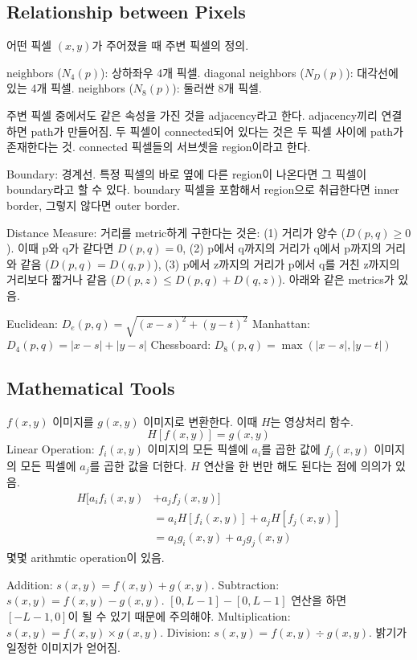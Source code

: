 \subsection{Relationship between Pixels}

어떤 픽셀 $(x, y)$가 주어졌을 때 주변 픽셀의 정의.

\bitmz
   neighbors ($N_4(p)$): 상하좌우 4개 픽셀.
   diagonal neighbors ($N_D(p)$): 대각선에 있는 4개 픽셀.
   neighbors ($N_8(p)$): 둘러싼 8개 픽셀.
\eitmz

주변 픽셀 중에서도 같은 속성을 가진 것을 adjacency라고 한다. adjacency끼리 연결하면 path가 만들어짐. 두 픽셀이 connected되어 있다는 것은 두 픽셀 사이에 path가 존재한다는 것. connected 픽셀들의 서브셋을 region이라고 한다.

Boundary: 경계선. 특정 픽셀의 바로 옆에 다른 region이 나온다면 그 픽셀이 boundary라고 할 수 있다. boundary 픽셀을 포함해서 region으로 취급한다면 inner border, 그렇지 않다면 outer border.

Distance Measure: 거리를 metric하게 구한다는 것은: (1) 거리가 양수 ($D(p, q) \geq 0$). 이때 p와 q가 같다면 $D(p, q) = 0$, (2) p에서 q까지의 거리가 q에서 p까지의 거리와 같음 ($D(p, q) = D(q, p)$), (3) p에서 z까지의 거리가 p에서 q를 거친 z까지의 거리보다 짧거나 같음 ($D(p, z) \leq D(p, q) + D(q, z)$). 아래와 같은 metrics가 있음.

\bitmz
  \itm Euclidean: $D_e(p, q) = \sqrt{(x - s)^2 + (y - t)^2}$
  \itm Manhattan: $D_4(p, q) = |x - s| + |y - s|$
  \itm Chessboard: $D_8(p, q) = \max(|x - s|, |y - t|)$
\eitmz

\subsection{Mathematical Tools}

$f(x, y)$ 이미지를 $g(x, y)$ 이미지로 변환한다. 이때 $H$는 영상처리 함수.
$$
H[f(x, y)] = g(x, y)
$$
Linear Operation: $f_i(x, y)$ 이미지의 모든 픽셀에 $a_i$를 곱한 값에 $f_j(x, y)$ 이미지의 모든 픽셀에 $a_j$를 곱한 값을 더한다. $H$ 연산을 한 번만 해도 된다는 점에 의의가 있음.
$$
\begin{aligned}
  H[a_i f_i(x, y) &+ a_j f_j(x, y)] \\
  &= a_i H[f_i(x, y)] + a_j H[f_j(x, y)] \\
  &= a_i g_i(x, y) + a_j g_j(x, y)
\end{aligned}
$$
몇몇 arithmtic operation이 있음.

\bitmz
  \itm Addition: $s(x, y) = f(x, y) + g(x, y)$.
  \itm Subtraction: $s(x, y) = f(x, y) - g(x, y)$. $[0, L - 1] - [0, L - 1]$ 연산을 하면 $[-L - 1, 0]$이 될 수 있기 때문에 주의해야.
  \itm Multiplication: $s(x, y) = f(x, y) \times g(x, y)$.
  \itm Division: $s(x, y) = f(x, y) \div g(x, y)$. 밝기가 일정한 이미지가 얻어짐.
\eitmz

